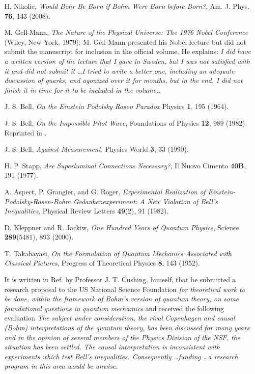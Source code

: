\documentclass[nofootinbib, secnumarabic, amsmath, nobibnotes,10pt,aps,pra]{revtex4-1}
\begin{document}
\begin{thebibliography}{999}
H. Nikolic, \emph{Would Bohr Be Born if Bohm Were Born before Born?}, Am. J. Phys. \textbf{76},  143 (2008).

M. Gell-Mann, \emph{The Nature of the Physical Universe: The 1976 Nobel Conference} (Wiley, New York, 1979); M. Gell-Mann presented his Nobel lecture but did not submit the manuscript for inclusion in the official volume. He explains: \textit{I did have a written version of the lecture that I gave in Sweden, but I was not satisfied with it and did not submit it \ldots I tried to write a better one, including an adequate discussion of quarks, and agonized over it for months, but in the end, I did not finish it in time for it to be included in the volume.}.

J. S. Bell, \emph{On the Einstein Podolsky Rosen Paradox} Physics {\bf 1},  195 (1964).

J. S. Bell, \emph{On the Impossible Pilot Wave}, Foundations of Physics \textbf{12},  989 (1982). Reprinted in \cite{om.Bell1987}.

J. S. Bell, \emph{Against Measurement}, Physics World \textbf{3},  33 (1990).

H. P. Stapp, \emph{Are Superluminal Connections Necessary?}, Il Nuovo Cimento \textbf{40B},  191 (1977).

A. Aspect, P. Grangier, and G. Roger, \emph{Experimental Realization of Einstein-Podolsky-Rosen-Bohm Gedankenexperiment: A New Violation of Bell's Inequalities}, Physical Review Letters \textbf{49}(2),  91 (1982).

D. Kleppner and R. Jackiw, \emph{One Hundred Years of Quantum Physics}, Science \textbf{289}(5481),  893 (2000).

T. Takabayasi, \emph{On the Formulation of Quantum Mechanics Associated with Classical Pictures}, Progress of Theoretical Physics \textbf{8},  143 (1952).

It is written in Ref. \cite{om.Bohmian1996} by Professor J. T. Cushing, himself, that he submitted a research proposal to the US National Science Foundation \textit{for theoretical work to be done, within the framework of Bohm's version of quantum theory, on some foundational questions in quantum mechamics} and received the following evaluation \textit{The subject under consideration, the rival Copenhagen and causal (Bohm) interpretations of the quantum theory, has been discussed for many years and in the opinion of several members of the Physics Division of the NSF, the situation has been settled. The causal interpretation is inconsistent with experiments which test Bell's inequalities. Consequently \ldots funding \ldots a research program in this area would be unwise.}


\end{thebibliography}
\end{document}
